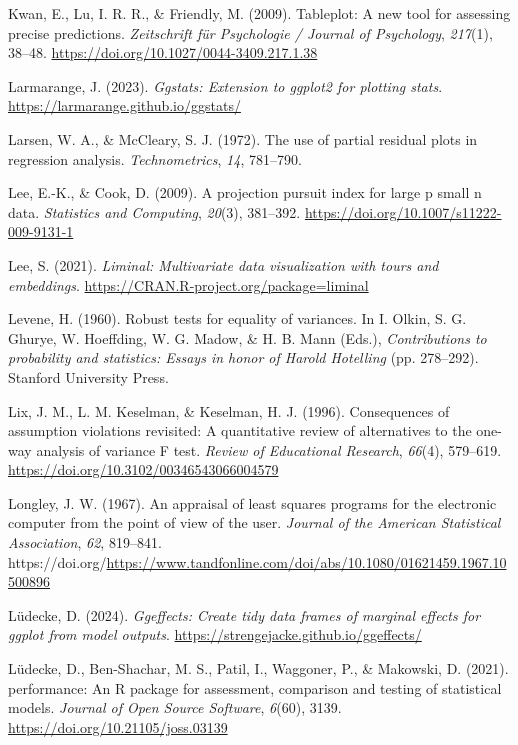 \documentclass[
  letterpaper,
  10pt,
  krantz2]{krantz}
\newlength{\cslhangindent}
\newenvironment{CSLReferences}[2] %
 {\begin{list}{}{%
  \setlength{\itemindent}{0pt}
  \setlength{\leftmargin}{0pt}
  \setlength{\parsep}{0pt}
  \ifodd #1
   \setlength{\leftmargin}{\cslhangindent}
   \setlength{\itemindent}{-1\cslhangindent}
  \fi
  \setlength{\itemsep}{#2\baselineskip}}}
 {\end{list}}
\begin{document}
\begin{CSLReferences}{1}{0}
Kwan, E., Lu, I. R. R., \& Friendly, M. (2009). Tableplot: A new tool
for assessing precise predictions. \emph{Zeitschrift f{ü}r Psychologie /
Journal of Psychology}, \emph{217}(1), 38--48.
\url{https://doi.org/10.1027/0044-3409.217.1.38}

Larmarange, J. (2023). \emph{Ggstats: Extension to ggplot2 for plotting
stats}. \url{https://larmarange.github.io/ggstats/}

Larsen, W. A., \& McCleary, S. J. (1972). The use of partial residual
plots in regression analysis. \emph{Technometrics}, \emph{14}, 781--790.

Lee, E.-K., \& Cook, D. (2009). A projection pursuit index for large p
small n data. \emph{Statistics and Computing}, \emph{20}(3), 381--392.
\url{https://doi.org/10.1007/s11222-009-9131-1}

Lee, S. (2021). \emph{Liminal: Multivariate data visualization with
tours and embeddings}. \url{https://CRAN.R-project.org/package=liminal}

Levene, H. (1960). Robust tests for equality of variances. In I. Olkin,
S. G. Ghurye, W. Hoeffding, W. G. Madow, \& H. B. Mann (Eds.),
\emph{Contributions to probability and statistics: Essays in honor of
{Harold Hotelling}} (pp. 278--292). Stanford University Press.

Lix, J. M., L. M. Keselman, \& Keselman, H. J. (1996). Consequences of
assumption violations revisited: A quantitative review of alternatives
to the one-way analysis of variance {F} test. \emph{Review of
Educational Research}, \emph{66}(4), 579--619.
\url{https://doi.org/10.3102/00346543066004579}

Longley, J. W. (1967). An appraisal of least squares programs for the
electronic computer from the point of view of the user. \emph{Journal of
the American Statistical Association}, \emph{62}, 819--841.
https://doi.org/\url{https://www.tandfonline.com/doi/abs/10.1080/01621459.1967.10500896}

Lüdecke, D. (2024). \emph{Ggeffects: Create tidy data frames of marginal
effects for ggplot from model outputs}.
\url{https://strengejacke.github.io/ggeffects/}

Lüdecke, D., Ben-Shachar, M. S., Patil, I., Waggoner, P., \& Makowski,
D. (2021). {performance}: An {R} package for assessment, comparison and
testing of statistical models. \emph{Journal of Open Source Software},
\emph{6}(60), 3139. \url{https://doi.org/10.21105/joss.03139}


\end{CSLReferences}
\end{document}
